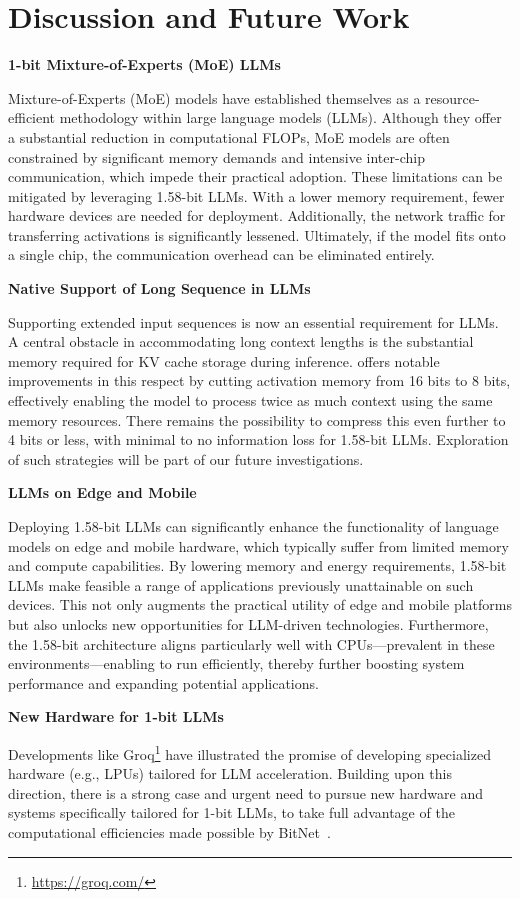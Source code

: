 \section{Discussion and Future Work}

\textbf{1-bit Mixture-of-Experts (MoE) LLMs}

Mixture-of-Experts (MoE) models have established themselves as a resource-efficient methodology within large language models (LLMs). Although they offer a substantial reduction in computational FLOPs, MoE models are often constrained by significant memory demands and intensive inter-chip communication, which impede their practical adoption. These limitations can be mitigated by leveraging 1.58-bit LLMs. With a lower memory requirement, fewer hardware devices are needed for deployment. Additionally, the network traffic for transferring activations is significantly lessened. Ultimately, if the model fits onto a single chip, the communication overhead can be eliminated entirely.

\textbf{Native Support of Long Sequence in LLMs}

Supporting extended input sequences is now an essential requirement for LLMs. A central obstacle in accommodating long context lengths is the substantial memory required for KV cache storage during inference.  offers notable improvements in this respect by cutting activation memory from 16 bits to 8 bits, effectively enabling the model to process twice as much context using the same memory resources. There remains the possibility to compress this even further to 4 bits or less, with minimal to no information loss for 1.58-bit LLMs. Exploration of such strategies will be part of our future investigations.

\textbf{LLMs on Edge and Mobile}

Deploying 1.58-bit LLMs can significantly enhance the functionality of language models on edge and mobile hardware, which typically suffer from limited memory and compute capabilities. By lowering memory and energy requirements, 1.58-bit LLMs make feasible a range of applications previously unattainable on such devices. This not only augments the practical utility of edge and mobile platforms but also unlocks new opportunities for LLM-driven technologies. Furthermore, the 1.58-bit architecture aligns particularly well with CPUs—prevalent in these environments—enabling  to run efficiently, thereby further boosting system performance and expanding potential applications.

\textbf{New Hardware for 1-bit LLMs}

Developments like Groq\footnote{\url{https://groq.com/}} have illustrated the promise of developing specialized hardware (e.g., LPUs) tailored for LLM acceleration. Building upon this direction, there is a strong case and urgent need to pursue new hardware and systems specifically tailored for 1-bit LLMs, to take full advantage of the computational efficiencies made possible by BitNet~\cite{bitnet}.